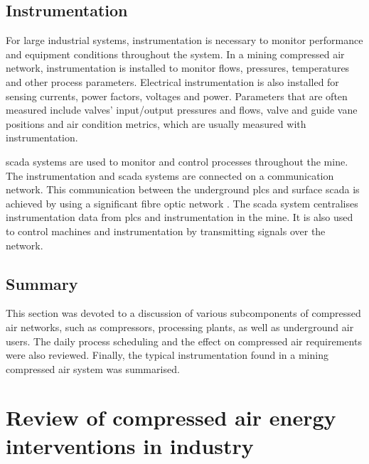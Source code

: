 \subsection{Instrumentation}
For large industrial systems, instrumentation is necessary to monitor performance and equipment conditions throughout the system. In a mining compressed air network, instrumentation is installed to monitor flows, pressures, temperatures and other process parameters. Electrical instrumentation is also installed for sensing currents, power factors, voltages and power. Parameters that are often measured include valves' input/output pressures and flows, valve and guide vane positions and air condition metrics, which are usually measured with instrumentation.	
\par
\Gls{scada} systems are used to monitor and control processes throughout the mine. The instrumentation and \gls{scada} systems are connected on a communication network.
This communication between the underground \glspl{plc} and surface \gls{scada} is achieved by using a significant fibre optic network \cite{schroeder2009energy}. The \gls{scada} system centralises instrumentation data from \glspl{plc} and instrumentation in the mine. It is also used to control machines and instrumentation by transmitting signals over the network. 
\subsection{Summary}
This section was devoted to a discussion of various subcomponents of compressed air networks, such as compressors, processing plants, as well as underground air users. The daily process scheduling and the effect on compressed air requirements were also reviewed. Finally, the typical instrumentation found in a mining compressed air system was summarised.
\section{Review of compressed air energy interventions in industry}
